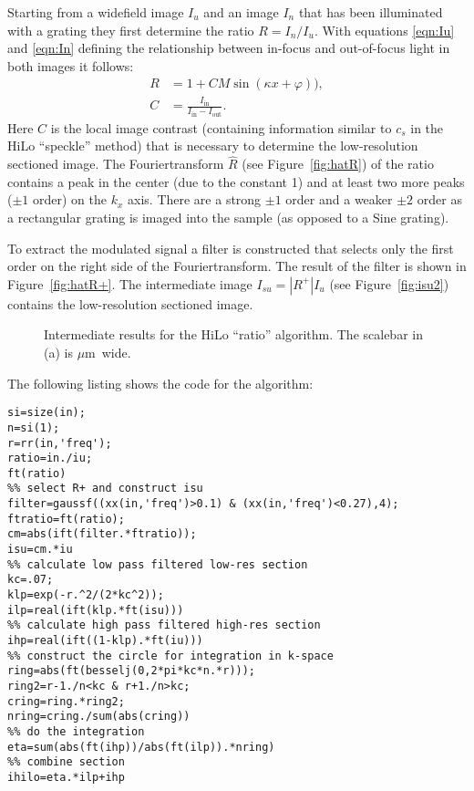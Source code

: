 \documentclass[11pt]{scrartcl}
\newcommand{\abs}[1]{\left| #1 \right|}
\newcommand{\figref}[1]{Figure~\ref{#1}}
\begin{document}
Starting from a widefield image $I_u$ and an image $I_n$ that has been
illuminated with a grating they first determine the ratio $R=I_n/I_u$.
With equations \eqref{eqn:Iu} and \eqref{eqn:In} defining the
relationship between in-focus and out-of-focus light in both images it
follows:
\begin{align}
  R&=1+CM\sin(\kappa x+\varphi)),\\
  C&=\frac{I_\textrm{in}}{I_\textrm{in}-I_\textrm{out}}.
\end{align}
Here $C$ is the local image contrast (containing information similar
to $c_s$ in the HiLo ``speckle'' method) that is necessary to
determine the low-resolution sectioned image. The Fouriertransform
$\hat R$ (see \figref{fig:hatR}) of the ratio contains a peak in the
center (due to the constant 1) and at least two more peaks ($\pm 1$
order) on the $k_x$ axis. There are a strong $\pm 1$ order and a
weaker $\pm 2$ order as a rectangular grating is imaged into the
sample (as opposed to a Sine grating).

To extract the modulated signal a filter is constructed that selects
only the first order on the right side of the Fouriertransform. The
result of the filter is shown in \figref{fig:hatR+}. The intermediate
image $I_{su}=\abs{R^+}I_u$ (see \figref{fig:isu2}) contains the
low-resolution sectioned image.

\begin{figure}[htb]
  \centering {}
  \caption{Intermediate results for the HiLo ``ratio'' algorithm. The scalebar in (a) is \unit[2]{$\mu$m} wide.}
  \label{fig:hilo2}
\end{figure}

The following listing shows the code for the algorithm:
\begin{lstlisting}
si=size(in);
n=si(1);
r=rr(in,'freq');
ratio=in./iu;
ft(ratio)
%% select R+ and construct isu
filter=gaussf((xx(in,'freq')>0.1) & (xx(in,'freq')<0.27),4);
ftratio=ft(ratio);
cm=abs(ift(filter.*ftratio));
isu=cm.*iu
%% calculate low pass filtered low-res section
kc=.07;
klp=exp(-r.^2/(2*kc^2));
ilp=real(ift(klp.*ft(isu)))
%% calculate high pass filtered high-res section
ihp=real(ift((1-klp).*ft(iu)))
%% construct the circle for integration in k-space
ring=abs(ft(besselj(0,2*pi*kc*n.*r)));
ring2=r-1./n<kc & r+1./n>kc;
cring=ring.*ring2;
nring=cring./sum(abs(cring))
%% do the integration
eta=sum(abs(ft(ihp))/abs(ft(ilp)).*nring)
%% combine section
ihilo=eta.*ilp+ihp
\end{lstlisting}
\end{document}
